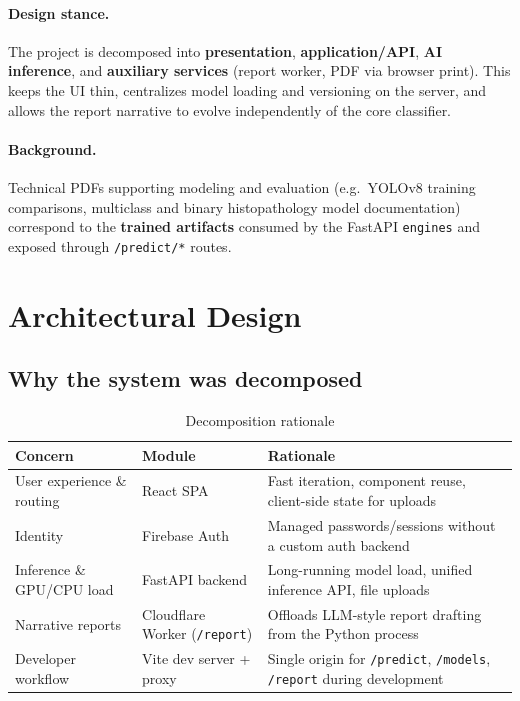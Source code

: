 \paragraph{Design stance.}
The project is decomposed into \textbf{presentation}, \textbf{application/API}, \textbf{AI inference}, and \textbf{auxiliary services} (report worker, PDF via browser print). This keeps the UI thin, centralizes model loading and versioning on the server, and allows the report narrative to evolve independently of the core classifier.

\paragraph{Background.}
Technical PDFs supporting modeling and evaluation (e.g.\ YOLOv8 training comparisons, multiclass and binary histopathology model documentation) correspond to the \textbf{trained artifacts} consumed by the FastAPI \texttt{engines} and exposed through \texttt{/predict/*} routes.

\section{Architectural Design}
\label{sec:arch}

\subsection{Why the system was decomposed}

\begin{table}[htbp]
  \centering
  \caption{Decomposition rationale}
  \begin{tabular}{@{}p{}p{}p{}@{}}
    \toprule
    \textbf{Concern} & \textbf{Module} & \textbf{Rationale} \\
    \midrule
    User experience \& routing & React SPA & Fast iteration, component reuse, client-side state for uploads \\
    Identity & Firebase Auth & Managed passwords/sessions without a custom auth backend \\
    Inference \& GPU/CPU load & FastAPI backend & Long-running model load, unified inference API, file uploads \\
    Narrative reports & Cloudflare Worker (\texttt{/report}) & Offloads LLM-style report drafting from the Python process \\
    Developer workflow & Vite dev server + proxy & Single origin for \texttt{/predict}, \texttt{/models}, \texttt{/report} during development \\
    \bottomrule
  \end{tabular}
\end{table}

